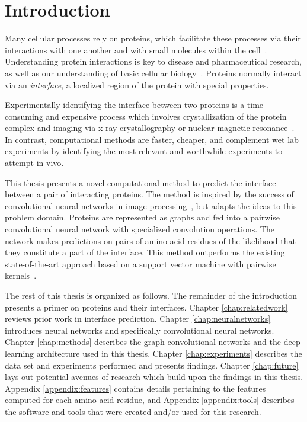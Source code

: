 

\chapter{Introduction}
\label{chap:intro}

Many cellular processes rely on proteins, which facilitate these processes via their interactions with one another and with small molecules within the cell~\cite{scheeffink2003}.
Understanding protein interactions is key to disease and pharmaceutical research, as well as our understanding of basic cellular biology~\cite{fauman2003, altman2003}.
Proteins normally interact via an \textit{interface}, a localized region of the protein with special properties.

Experimentally identifying the interface between two proteins is a time consuming and expensive process which involves crystallization of the protein complex and imaging via x-ray crystallography or nuclear magnetic resonance~\cite{bijelic2017, ilarisavino2017, wang2017}.
In contrast, computational methods are faster, cheaper, and complement wet lab experiments by identifying the most relevant and worthwhile experiments to attempt in vivo.

This thesis presents a novel computational method to predict the interface between a pair of interacting proteins.
The method is inspired by the success of convolutional neural networks in image processing~\cite{gu2015, lecun2010}, but adapts the ideas to this problem domain.
Proteins are represented as graphs and fed into a pairwise convolutional neural network with specialized convolution operations.
The network makes predictions on pairs of amino acid residues of the likelihood that they constitute a part of the interface. 
This method outperforms the existing state-of-the-art approach based on a support vector machine with pairwise kernels~\cite{minhas2014}.

The rest of this thesis is organized as follows.
The remainder of the introduction presents a primer on proteins and their interfaces. 
Chapter \ref{chap:relatedwork} reviews prior work in interface prediction.
Chapter \ref{chap:neuralnetworks} introduces neural networks and specifically convolutional neural networks.
Chapter \ref{chap:methods} describes the graph convolutional networks and the deep learning architecture used in this thesis.
Chapter \ref{chap:experiments} describes the data set and experiments performed and presents findings. 
Chapter \ref{chap:future} lays out potential avenues of research which build upon the findings in this thesis. 
Appendix \ref{appendix:features} contains details pertaining to the features computed for each amino acid residue, and Appendix \ref{appendix:tools} describes the software and tools that were created and/or used for this research.

